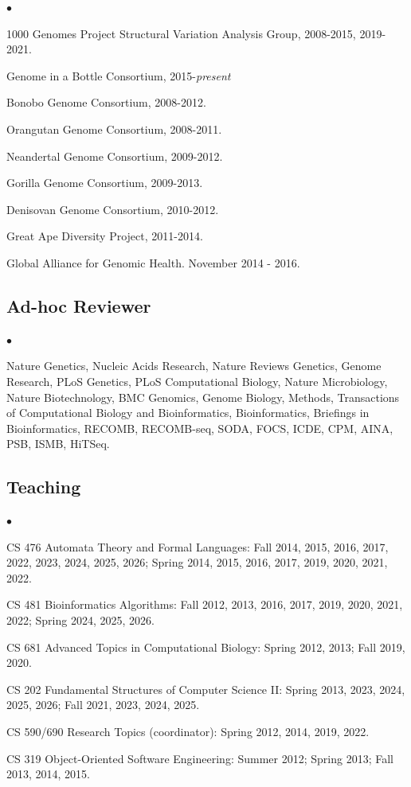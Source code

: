 \documentclass[margin,line]{res}
\newenvironment{list2}{
  \begin{list}{$\bullet$}{%
      \setlength{\itemsep}{0.1cm}
      \setlength{\parsep}{0in} \setlength{\parskip}{0in}
      \setlength{\topsep}{0in} \setlength{\partopsep}{0in} 
      \setlength{\leftmargin}{0.2in}}}{\end{list}}
\begin{document}
\begin{resume}
\begin{list2}
    \item
        1000 Genomes Project Structural Variation Analysis Group, 2008-2015, 2019-2021.
    \item
        Genome in a Bottle Consortium, 2015-{\it present}
    \item
        Bonobo Genome Consortium, 2008-2012.
    \item
        Orangutan Genome Consortium, 2008-2011.
    \item
        Neandertal Genome Consortium, 2009-2012.
    \item
        Gorilla Genome Consortium, 2009-2013.
    \item
        Denisovan Genome Consortium, 2010-2012.
    \item
        Great Ape Diversity Project, 2011-2014.
    \item
        Global Alliance for Genomic Health. November 2014 - 2016.
\end{list2}

\vspace{-0.4cm}
\subsection{\small \sc Ad-hoc Reviewer}
\begin{list2}
\item
  Nature Genetics, Nucleic Acids Research, Nature Reviews Genetics, Genome Research, PLoS Genetics, PLoS Computational Biology, Nature Microbiology,
  Nature Biotechnology, BMC Genomics, Genome Biology, Methods, Transactions of Computational Biology and Bioinformatics,
  Bioinformatics, Briefings in Bioinformatics, RECOMB, RECOMB-seq, SODA, FOCS, ICDE, CPM, AINA, PSB, ISMB, HiTSeq.
\end{list2}

\vspace{-0.4cm}
\subsection{\small \sc Teaching}
\begin{list2}
  \item CS 476 Automata Theory and Formal Languages: Fall 2014, 2015, 2016, 2017, 2022, 2023, 2024, 2025, 2026; Spring 2014, 2015, 2016, 2017, 2019, 2020, 2021, 2022. 
  \item CS 481 Bioinformatics Algorithms: Fall 2012, 2013, 2016, 2017, 2019, 2020, 2021, 2022; Spring 2024, 2025, 2026.
  \item CS 681 Advanced Topics in Computational Biology: Spring 2012, 2013; Fall 2019, 2020.
  \item CS 202 Fundamental Structures of Computer Science II: Spring 2013, 2023, 2024, 2025, 2026; Fall 2021, 2023, 2024, 2025.
  \item CS 590/690 Research Topics (coordinator): Spring 2012, 2014, 2019, 2022.
  \item CS 319 Object-Oriented Software Engineering: Summer 2012; Spring 2013; Fall 2013, 2014, 2015.
\end{list2}


\end{resume}
\end{document}
